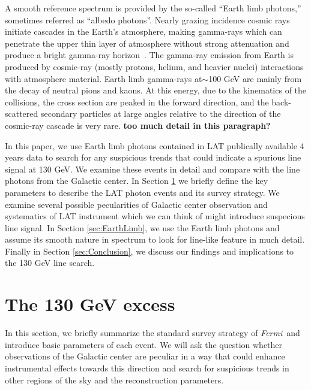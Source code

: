 \documentclass[aps,twocolumn,prd,superscriptaddress,showpacs,nofootinbib,fixfloat]{revtex4}
\newcommand{\Fermi}{{\slshape Fermi}}
\newcommand\Refsec[1]{Section \ref{sec:#1}}
\begin{document}
A smooth reference spectrum is provided by the so-called ``Earth limb
photons,'' sometimes referred as ``albedo photons''. Nearly grazing incidence
cosmic rays initiate cascades in the Earth's atmosphere, making 
gamma-rays which can
penetrate the upper thin layer of atmosphere without strong
attenuation and produce a bright gamma-ray
horizon~\citep[e.g.][and reference therein]{FermiLimb}.
The gamma-ray emission from Earth is produced by
cosmic-ray (mostly protons, helium, and heavier nuclei)
interactions with atmosphere material. Earth limb gamma-rays
at$\sim$100 GeV are mainly from the decay of neutral pions
and kaons. At this energy, due to the kinematics of the
collisions, the cross section are peaked in the forward
direction, and the back-scattered secondary particles at
large angles relative to the direction of the cosmic-ray
cascade is very rare. {\bf too much detail in this paragraph?}

In this paper, we use Earth limb photons contained in LAT
publically available 4 years data to search for any
suspicious trends that could indicate a spurious line signal
at 130 GeV.  We examine these events in detail and compare
with the line photons from the Galactic center.  In
\Refsec{130GeV} we briefly define the key parameters to
describe the LAT photon events and its survey strategy. We
examine several possible pecularities of Galactic center
observation and systematics of LAT instrument which we can
think of might introduce suspecious line signal. In
\Refsec{EarthLimb}, we use the Earth limb photons and assume
its smooth nature in spectrum to look for line-like feature
in much detail. Finally in \Refsec{Conclusion}, we discuss
our findings and implications to the 130 GeV line search.


\section{The 130 GeV excess}
\label{sec:130GeV}
In this section, we briefly summarize the standard survey strategy of \Fermi\ 
and introduce basic parameters of each event.  We will
ask the question whether observations of the Galactic center
are peculiar in a way that could enhance instrumental
effects towards this direction and search for suspicious trends in
other regions of the sky and the reconstruction parameters.

\end{document}
